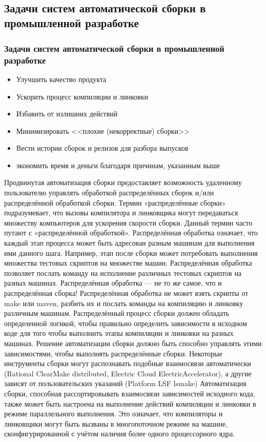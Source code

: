 \documentclass{../industrial-development}
\begin{document}
~\cite{Wiki_Build_automation}

\subsection{Задачи систем автоматической сборки в промышленной разработке}

\begin{frame} \frametitle{Задачи систем автоматической сборки в промышленной разработке}
 
  \begin{itemize}
  \item Улучшить качество продукта
  \item Ускорить процесс компиляции и линковки
  \item Избавить от излишних действий
  \item Минимизировать <<плохие (некорректные) сборки>>
  \item Вести истории сборок и релизов для разбора выпусков
  \item экономить время и деньги благодаря причинам, указанным выше
  \end{itemize}
\end{frame}

\lecturenotes
Продвинутая автоматизация сборки предоставляет возможность удаленному пользователю управлять обработкой распределённых сборок и/или распределённой обработкой сборки. Термин «распределённые сборки» подразумевает, что вызовы компилятора и линковщика могут передаваться множеству компьютеров для ускорения скорости сборки. Данный термин часто путают с «распределённой обработкой». Распределённая обработка означает, что каждый этап процесса может быть адресован разным машинам для выполнения ими данного шага. Например, этап после сборки может потребовать выполнения множества тестовых скриптов на множестве машин. Распределённая обработка позволяет послать команду на исполнение различных тестовых скриптов на разных машинах. Распределённая обработка — не то же самое, что и распределённая сборка! Распределённая обработка не может взять скрипты от make или maven, разбить их и послать команды на компиляцию и линковку различным машинам. Распределённый процесс сборки должен обладать определенной логикой, чтобы правильно определить зависимости в исходном коде для того чтобы выполнить этапы компиляции и линковки на разных машинах. Решение автоматизации сборки должно быть способно управлять этими зависимостями, чтобы выполнять распределённые сборки. Некоторые инструменты сборки могут распознавать подобные взаимосвязи автоматически (Rational ClearMake distributed, Electric Cloud ElectricAccelerator), а другие зависят от пользовательских указаний (Platform LSF lsmake) Автоматизация сборки, способная рассортировывать взаимосвязи зависимостей исходного кода, также может быть настроена на выполнение действий компиляции и линковки в режиме параллельного выполнения. Это означает, что компиляторы и линковщики могут быть вызваны в многопоточном режиме на машине, сконфигурированной с учётом наличия более одного процессорного ядра.
\end{document}
